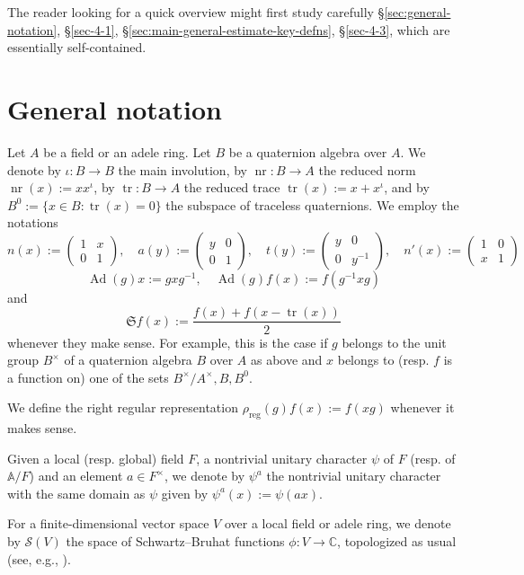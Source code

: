 \documentclass[reqno,10pt]{amsart}
\theoremstyle{plain} %
\theoremstyle{definition}
\theoremstyle{plain} %
\theoremstyle{remark}
\theoremstyle{itplain} %
\theoremstyle{remark} %
\numberwithin{equation}{section}
\DeclareMathOperator{\Ad}{Ad}
\DeclareMathOperator{\reg}{reg}
\DeclareMathOperator{\nr}{nr}
\DeclareMathOperator{\tr}{tr}
\begin{document}
The reader looking for a quick overview might first study carefully \S\ref{sec:general-notation}, \S\ref{sec-4-1}, \S\ref{sec:main-general-estimate-key-defns}, \S\ref{sec-4-3}, which are essentially self-contained.


\section{General notation\label{sec:general-notation}}
\label{sec-1-8}
Let $A$ be a field or an adele ring.  Let $B$ be a quaternion algebra over $A$.  We denote by $\iota : B \rightarrow B$ the main involution, by $\nr : B \rightarrow A$ the reduced norm $\nr(x) := x x^{\iota}$, by $\tr : B \rightarrow A$ the reduced trace $\tr(x) := x + x^{\iota}$, and by $B^0 := \{x \in B : \tr(x) = 0\}$
the subspace of traceless quaternions.  We employ the notations
\[
  n(x) := \begin{pmatrix}
    1 & x \\
    0 & 1
  \end{pmatrix}, \quad a(y) :=
  \begin{pmatrix}
    y & 0 \\
    0 & 1
  \end{pmatrix}, \quad t(y) :=
  \begin{pmatrix}
    y & 0 \\
    0 & y^{-1}
  \end{pmatrix}, \quad n'(x) :=
  \begin{pmatrix}
    1 & 0 \\
    x & 1
  \end{pmatrix}
\]
\[
  \Ad(g) x := g x g^{-1}, \quad \Ad(g) f(x) := f(g^{-1} x g)
\]
and
\[
  \mathfrak{S} f(x) := \frac{f(x) + f(x - \tr(x))}{2}
\]
whenever they make sense.  For example, this is the case if $g$ belongs to the unit group $B^\times$ of a quaternion algebra $B$ over $A$ as above and $x$ belongs to (resp. $f$ is a function on) one of the sets $B^\times/A^\times, B, B^0$. 

We define the right regular representation $\rho_{\reg}(g) f(x) := f(x g)$ whenever it makes sense.

Given a local (resp. global) field $F$, a nontrivial unitary character $\psi$ of $F$ (resp. of $\mathbb{A}/F$) and an element $a \in F^\times$, we denote by $\psi^a$ the nontrivial unitary character with the same domain as $\psi$ given by $\psi^a(x) := \psi(a x)$.

For a finite-dimensional vector space $V$ over a local field or adele ring, we denote by $\mathcal{S}(V)$ the space of Schwartz--Bruhat functions $\phi : V \rightarrow \mathbb{C}$, topologized as usual (see, e.g., \cite[\S11]{MR0165033}).
\end{document}
